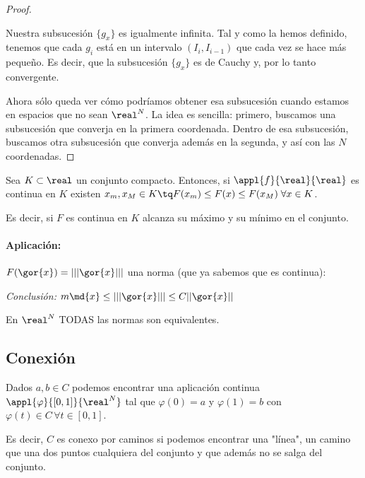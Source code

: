 \documentclass{apuntes}
\begin{document}
\begin{proof}
\begin{center}
\end{center}

Nuestra subsucesión $\{g_x\}$ es igualmente infinita. Tal y como la hemos definido, tenemos que cada $g_i$ está en un intervalo $(I_i, I_{i-1})$ que cada vez se hace más pequeño. Es decir, que la subsucesión $\{g_x\}$ es de Cauchy y, por lo tanto convergente.

Ahora sólo queda ver cómo podríamos obtener esa subsucesión cuando estamos en espacios que no sean $\real^N$. La idea es sencilla: primero, buscamos una subsucesión que converja en la primera coordenada. Dentro de esa subsucesión, buscamos otra subsucesión que converja además en la segunda, y así con las $N$ coordenadas. 
\end{proof}

\begin{theorem} Sea $K\subset \real$ un conjunto compacto. Entonces, si $\appl{f}{\real}{\real}$ es continua en $K$ existen  $x_m,x_M \in K \tq F(x_m) \leq F(x) \leq F(x_M)\;\forall x \in K$.

Es decir, si $F$ es continua en $K$ alcanza su máximo y su mínimo en el conjunto.
\end{theorem}

\paragraph{Aplicación:}
$F(\gor{x}) = |||\gor{x}|||$ una norma (que ya sabemos que es continua):

\emph{Conclusión:} $m \md{x} \leq |||\gor{x}||| \leq C||\gor{x}||$

\begin{theorem}
En $\real^N$ TODAS las normas son equivalentes. 
\end{theorem}

\subsection{Conexión}
\begin{defn}
Dados $a,b \in C$ podemos encontrar una aplicación continua $\appl{\varphi}{[0,1]}{\real^N}$ tal que $\varphi(0) = a$ y  $\varphi(1) = b$ con $ \varphi(t) \in C\, \forall t \in [0,1]$. 

Es decir, $C$ es conexo por caminos si podemos encontrar una "línea", un camino que una dos puntos cualquiera del conjunto y que además no se salga del conjunto.
\end{defn}
\end{document}
